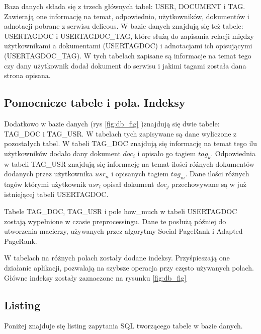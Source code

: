 \documentclass[11pt,a4paper]{report}
\begin{document}
Baza danych składa się z trzech głównych tabel: USER, DOCUMENT i TAG. Zawierają one informację na temat, odpowiednio, użytkowników, dokumentów i adnotacji pobrane z serwisu delicous. W bazie danych znajdują się też tabele: USERTAGDOC i USERTAGDOC\_TAG, które służą do zapisania relacji między użytkownikami a dokumentami (USERTAGDOC) i adnotacjami ich opisującymi (USERTAGDOC\_TAG). W tych tabelach zapisane są  informacje na temat tego czy dany użytkownik dodał dokument do serwisu i jakimi tagami została dana strona opisana.

\subsection{Pomocnicze tabele i pola. Indeksy}
Dodatkowo w bazie danych (rys \ref{fig:db_fig} )znajdują się dwie tabele: TAG\_DOC i TAG\_USR. W tabelach tych zapisywane są dane wyliczone z pozostałych tabel. W tabeli TAG\_DOC znajdują się informację na temat tego ilu użytkowników dodało dany dokument $doc_i$  i opisało go tagiem $tag_k$. Odpowiednia w tabeli TAG\_USR znajdują się informację na temat ilości różnych dokumentów dodanych przez użytkownika $usr_n$ i opisanych tagiem $tag_m$. Dane ilości różnych tagów którymi użytkownik $usr_l$ opisał dokument $doc_j$ przechowywane są w już istniejącej tabeli USERTAGDOC. 

Tabele TAG\_DOC, TAG\_USR i pole how\_much w tabeli USERTAGDOC zostają wypełnione w czasie preprocessingu. Dane te posłużą  później do utworzenia macierzy, używanych przez algorytmy Social PageRank i Adapted PageRank. 


W tabelach na różnych polach zostały dodane indeksy. Przyśpieszają one działanie aplikacji, pozwalają na szybsze operacja przy często używanych polach. Główne indeksy zostały zaznaczone na rysunku \ref{fig:db_fig}

\subsection{Listing}
Poniżej znajduje się listing zapytania SQL tworzącego tabele w bazie danych.
\end{document}
